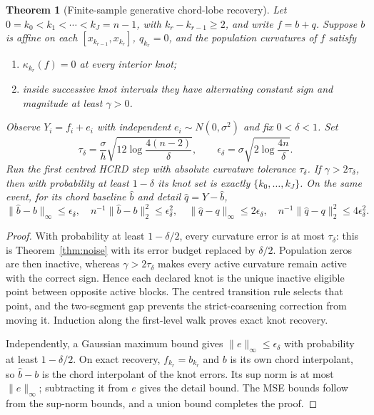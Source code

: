 \documentclass[review,onefignum,onetabnum]{siamonline250211}
\newtheorem{theorem}{Theorem}
\begin{document}
\begin{theorem}[Finite-sample generative chord-lobe recovery]
\label{thm:generative-recovery}
Let $0=k_0<k_1<\cdots<k_J=n-1$, with $k_r-k_{r-1}\ge2$, and write
$f=b+q$.  Suppose $b$ is affine on each $[x_{k_{r-1}},x_{k_r}]$,
$q_{k_r}=0$, and the population curvatures of $f$ satisfy
\begin{enumerate}
 \item $\kappa_{k_r}(f)=0$ at every interior knot;
 \item inside successive knot intervals they have alternating constant sign
       and magnitude at least $\gamma>0$.
\end{enumerate}
Observe $Y_i=f_i+e_i$ with independent $e_i\sim N(0,\sigma^2)$ and fix
$0<\delta<1$.  Set
\begin{equation}
 \tau_\delta=\frac{\sigma}{h}
 \sqrt{12\log\frac{4(n-2)}{\delta}},\qquad
 \epsilon_\delta=\sigma\sqrt{2\log\frac{4n}{\delta}}.
\end{equation}
Run the first centred HCRD step with absolute curvature tolerance
$\tau_\delta$.  If $\gamma>2\tau_\delta$, then with probability at least
$1-\delta$ its knot set is exactly $\{k_0,\ldots,k_J\}$.  On the same event,
for its chord baseline $\widehat b$ and detail $\widehat q=Y-\widehat b$,
\begin{equation}
 \|\widehat b-b\|_\infty\le\epsilon_\delta,
 \quad n^{-1}\|\widehat b-b\|_2^2\le\epsilon_\delta^2,
 \quad \|\widehat q-q\|_\infty\le2\epsilon_\delta,
 \quad n^{-1}\|\widehat q-q\|_2^2\le4\epsilon_\delta^2.
\end{equation}
\end{theorem}
\begin{proof}
With probability at least $1-\delta/2$, every curvature error is at most
$\tau_\delta$: this is Theorem~\ref{thm:noise} with its error budget replaced
by $\delta/2$.  Population zeros are then inactive, whereas
$\gamma>2\tau_\delta$ makes every active curvature remain active with the
correct sign.  Hence each declared knot is the unique inactive eligible point
between opposite active blocks.  The centred transition rule selects that
point, and the two-segment gap prevents the strict-coarsening correction from
moving it.  Induction along the first-level walk proves exact knot recovery.

Independently, a Gaussian maximum bound gives
$\|e\|_\infty\le\epsilon_\delta$ with probability at least $1-\delta/2$.
On exact recovery, $f_{k_r}=b_{k_r}$ and $b$ is its own chord interpolant, so
$\widehat b-b$ is the chord interpolant of the knot errors.  Its sup norm is at
most $\|e\|_\infty$; subtracting it from $e$ gives the detail bound.  The MSE
bounds follow from the sup-norm bounds, and a union bound completes the proof.
\end{proof}
\end{document}
